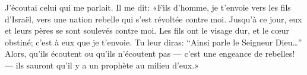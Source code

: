 J’écoutai celui qui me parlait.
Il me dit: «Fils d’homme, je t’envoie vers les fils d’Israël,
	vers une nation rebelle qui s’est révoltée contre moi.
Jusqu’à ce jour, eux et leurs pères se sont soulevés contre moi.
Les fils ont le visage dur, et le cœur obstiné; c’est à eux que je t’envoie.
Tu leur diras: “Ainsi parle le Seigneur Dieu…”
	Alors, qu’ils écoutent ou qu’ils n’écoutent pas
	--- c’est une engeance de rebelles! ---
	ils sauront qu’il y a un prophète au milieu d’eux.»
